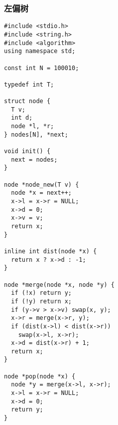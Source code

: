 \subsubsection{左偏树}
\begin{verbatim}
#include <stdio.h>
#include <string.h>
#include <algorithm>
using namespace std;

const int N = 100010;

typedef int T;

struct node {
  T v;
  int d;
  node *l, *r;
} nodes[N], *next;

void init() {
  next = nodes;
}

node *node_new(T v) {
  node *x = next++;
  x->l = x->r = NULL;
  x->d = 0;
  x->v = v;
  return x;
}

inline int dist(node *x) {
  return x ? x->d : -1;
}

node *merge(node *x, node *y) {
  if (!x) return y;
  if (!y) return x;
  if (y->v > x->v) swap(x, y);
  x->r = merge(x->r, y);
  if (dist(x->l) < dist(x->r))
    swap(x->l, x->r);
  x->d = dist(x->r) + 1;
  return x;
}

node *pop(node *x) {
  node *y = merge(x->l, x->r);
  x->l = x->r = NULL;
  x->d = 0;
  return y;
}
\end{verbatim}
